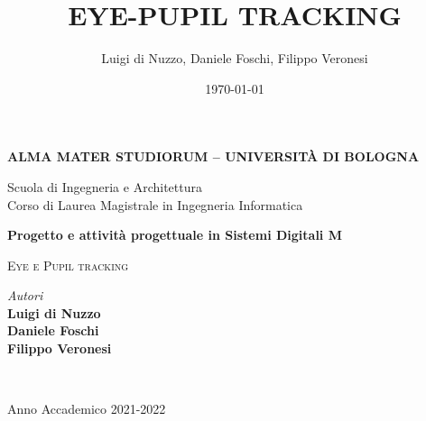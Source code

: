 \title{EYE-PUPIL TRACKING}
\author{Luigi di Nuzzo, Daniele Foschi, Filippo Veronesi}
\date{\today}

\begin{titlepage}
	\begin{center}
		
		\large
		\textbf{ALMA MATER STUDIORUM -- UNIVERSITÀ DI BOLOGNA}
		\\
		\noindent\hrulefill
		\vspace{0.4cm}
		
		\Large
		Scuola di Ingegneria e Architettura \\
		Corso di Laurea Magistrale in Ingegneria Informatica
		
		\Huge
		\vspace{4cm}
		\textbf{
			Progetto e attività progettuale in Sistemi Digitali M
		}
		
		\large
		\vspace{1cm}
		\textsc{Eye e Pupil tracking}
		
		\vspace{5.5cm}
		\begin{minipage}[t]{0.64\textwidth}
			\begin{flushleft}
				\textit{Autori} 
				\\ 
				\textbf{Luigi di Nuzzo}
				\\
				\vspace{0.4cm}
				\textbf{Daniele Foschi}
				\\
				\vspace{0.4cm}
				\textbf{Filippo Veronesi}
			\end{flushleft}
		\end{minipage}
		\begin{minipage}[t]{0.34\textwidth}
			\begin{flushright}
			\end{flushright}
		\end{minipage}\\
		
		\vfill
		\noindent\hrulefill
		\vspace{0.3cm}
		\Large
		
		Anno Accademico 2021-2022
	\end{center}
\end{titlepage}
\restoregeometry
